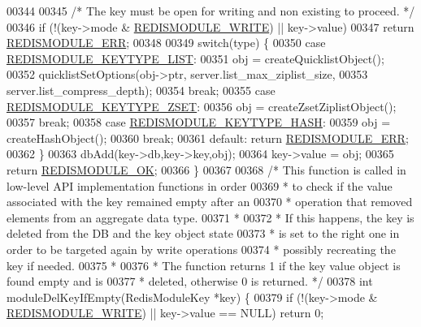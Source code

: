 \begin{DoxyCode}
00344 
00345     \textcolor{comment}{/* The key must be open for writing and non existing to proceed. */}
00346     \textcolor{keywordflow}{if} (!(key->mode & \hyperlink{redismodule_8h_a73b37117ef94cb4a904361afcc51b6b4}{REDISMODULE\_WRITE}) || key->value)
00347         \textcolor{keywordflow}{return} \hyperlink{redismodule_8h_a3df6f5bd5247289e66f44437a7cddd49}{REDISMODULE\_ERR};
00348 
00349     \textcolor{keywordflow}{switch}(type) \{
00350     \textcolor{keywordflow}{case} \hyperlink{redismodule_8h_a4c01058971d9d8fe1cfa02071fa87fa6}{REDISMODULE\_KEYTYPE\_LIST}:
00351         obj = createQuicklistObject();
00352         quicklistSetOptions(obj->ptr, server.list\_max\_ziplist\_size,
00353                             server.list\_compress\_depth);
00354         \textcolor{keywordflow}{break};
00355     \textcolor{keywordflow}{case} \hyperlink{redismodule_8h_a93d1514d4c11cc65551b36cfd9a72cc2}{REDISMODULE\_KEYTYPE\_ZSET}:
00356         obj = createZsetZiplistObject();
00357         \textcolor{keywordflow}{break};
00358     \textcolor{keywordflow}{case} \hyperlink{redismodule_8h_ac019575ac57520c325597e2fb54c5b71}{REDISMODULE\_KEYTYPE\_HASH}:
00359         obj = createHashObject();
00360         \textcolor{keywordflow}{break};
00361     \textcolor{keywordflow}{default}: \textcolor{keywordflow}{return} \hyperlink{redismodule_8h_a3df6f5bd5247289e66f44437a7cddd49}{REDISMODULE\_ERR};
00362     \}
00363     dbAdd(key->db,key->key,obj);
00364     key->value = obj;
00365     \textcolor{keywordflow}{return} \hyperlink{redismodule_8h_a1bc5bfd69abcd378ff52c640adc5418d}{REDISMODULE\_OK};
00366 \}
00367 
00368 \textcolor{comment}{/* This function is called in low-level API implementation functions in order}
00369 \textcolor{comment}{ * to check if the value associated with the key remained empty after an}
00370 \textcolor{comment}{ * operation that removed elements from an aggregate data type.}
00371 \textcolor{comment}{ *}
00372 \textcolor{comment}{ * If this happens, the key is deleted from the DB and the key object state}
00373 \textcolor{comment}{ * is set to the right one in order to be targeted again by write operations}
00374 \textcolor{comment}{ * possibly recreating the key if needed.}
00375 \textcolor{comment}{ *}
00376 \textcolor{comment}{ * The function returns 1 if the key value object is found empty and is}
00377 \textcolor{comment}{ * deleted, otherwise 0 is returned. */}
00378 \textcolor{keywordtype}{int} moduleDelKeyIfEmpty(RedisModuleKey *key) \{
00379     \textcolor{keywordflow}{if} (!(key->mode & \hyperlink{redismodule_8h_a73b37117ef94cb4a904361afcc51b6b4}{REDISMODULE\_WRITE}) || key->value == NULL) \textcolor{keywordflow}{return} 0;

\end{DoxyCode}
